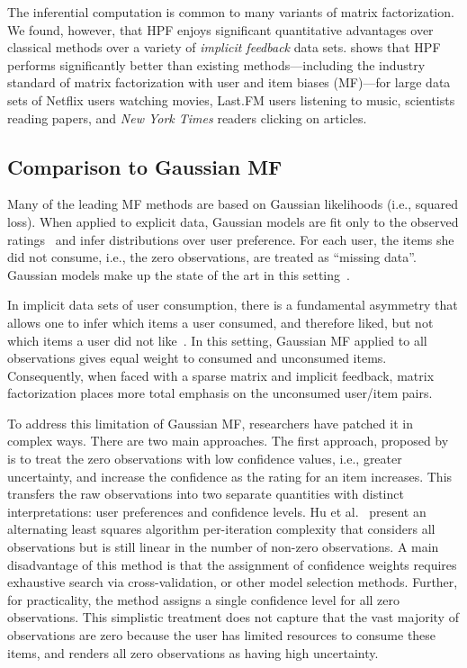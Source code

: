 The inferential computation is common to many variants of matrix
factorization.  We found, however, that HPF enjoys significant
quantitative advantages over classical methods over a variety of
\emph{implicit feedback} data sets.  shows
that HPF performs significantly better than existing
methods---including the industry standard of matrix factorization with
user and item biases (MF)---for large data sets of Netflix users
watching movies, Last.FM users listening to music, scientists reading
papers, and \textit{New York Times} readers clicking on articles.

\subsection{Comparison to Gaussian MF}
Many of the leading MF methods are based on Gaussian likelihoods
(i.e., squared loss). When applied to explicit data, Gaussian models
are fit only to the observed ratings~\cite{Koren:2009} and infer
distributions over user preference. For each user, the items she did
not consume, i.e., the zero observations, are treated as ``missing
data''. Gaussian models make up the state of the art in this
setting~\cite{Salakhutdinov:2008, Salakhutdinov:2008a,Koren:2009}.

In implicit data sets of user consumption, there is a fundamental
asymmetry that allows one to infer which items a user consumed, and
therefore liked, but not which items a user did not
like~\cite{Hu:2008p9402}. In this setting, Gaussian MF applied to all
observations gives equal weight to consumed and unconsumed items.
Consequently, when faced with a sparse matrix and implicit feedback,
matrix factorization places more total emphasis on the unconsumed
user/item pairs.

To address this limitation of Gaussian MF, researchers have patched it
in complex ways. There are two main approaches. The first approach,
proposed by \cite{Hu:2008p9402} is to treat the zero observations with
low confidence values, i.e., greater uncertainty, and increase the
confidence as the rating for an item increases. This transfers the raw
observations into two separate quantities with distinct
interpretations: user preferences and confidence levels. Hu et
al.~\cite{Hu:2008p9402} present an alternating least squares algorithm
per-iteration complexity that considers all observations but is still
linear in the number of non-zero observations. A main disadvantage of
this method is that the assignment of confidence weights requires
exhaustive search via cross-validation, or other model selection
methods. Further, for practicality, the method assigns a single
confidence level for all zero observations. This simplistic treatment
does not capture that the vast majority of observations are zero
because the user has limited resources to consume these items, and
renders all zero observations as having high uncertainty.

